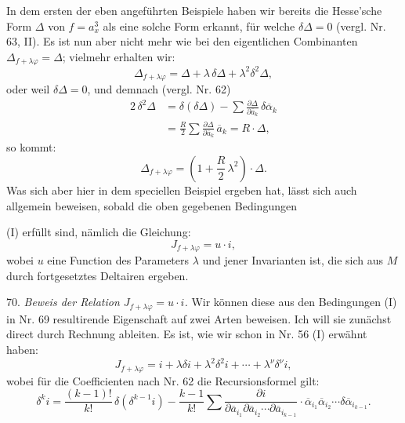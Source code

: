 \documentclass[11pt]{article}
\providecommand{\weberpage}[1]{}
\providecommand{\weq}[2]{\begin{equation}\tag{#1}#2\end{equation}}
\begin{document}
In dem ersten der eben angeführten Beispiele haben wir bereits die Hesse'sche Form $\varDelta$ von $f=a_x^3$ als eine solche Form erkannt, für welche $\delta\varDelta=0$ (vergl. Nr. 63, II). Es ist nun aber nicht mehr wie bei den eigentlichen Combinanten $\varDelta_{f+\lambda\varphi}=\varDelta$; vielmehr erhalten wir:
\[
\varDelta_{f+\lambda\varphi} = \varDelta + \lambda\,\delta\varDelta + \lambda^2\delta^2\varDelta,
\]
oder weil $\delta\varDelta=0$, und demnach (vergl. Nr. 62)
\[
\begin{aligned}
2\,\delta^2\varDelta &= \delta(\delta\varDelta) - \sum \frac{\partial\varDelta}{\partial\overline a_k}\,\delta\overline\alpha_k\\
&= \frac{R}{2}\sum \frac{\partial\varDelta}{\partial\overline a_k}\,\overline a_k = R\cdot\varDelta,
\end{aligned}
\]
so kommt:
\weq{II}{\varDelta_{f+\lambda\varphi} = \left(1 + \frac{R}{2}\,\lambda^2\right)\cdot\varDelta.}
Was sich aber hier in dem speciellen Beispiel ergeben hat, lässt sich auch allgemein beweisen, sobald die oben gegebenen Bedingungen


\weberpage{75}
(I) erfüllt sind, nämlich die Gleichung:
\[
J_{f+\lambda\varphi} = u\cdot i,
\]
wobei $u$ eine Function des Parameters $\lambda$ und jener Invarianten ist, die sich aus $M$ durch fortgesetztes Deltairen ergeben.

70. \textit{Beweis der Relation $J_{f+\lambda\varphi}=u\cdot i$.} Wir können diese aus den Bedingungen (I) in Nr. 69 resultirende Eigenschaft auf zwei Arten beweisen. Ich will sie zunächst direct durch Rechnung ableiten. Es ist, wie wir schon in Nr. 56 (I) erwähnt haben:
\weq{I}{J_{f+\lambda\varphi} = i + \lambda\delta i + \lambda^2\delta^2 i + \cdots + \lambda^\nu \delta^\nu i,}
wobei für die Coefficienten nach Nr. 62 die Recursionsformel gilt:
\[
\delta^k i = \frac{(k-1)!}{k!}\,\delta(\delta^{k-1}i) - \frac{k-1}{k!}\sum \frac{\partial i}{\partial\overline a_{i_1}\partial\overline a_{i_2}\cdots\partial\overline a_{i_{k-1}}}\cdot \overline\alpha_{i_1}\overline\alpha_{i_2}\cdots \delta\overline\alpha_{i_{k-1}}.
\]
\end{document}
